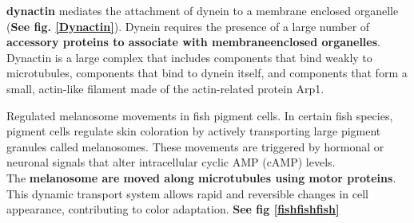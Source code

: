 \documentclass[../main.tex]{subfiles}
\begin{document}
\textbf{\gls{dynactin}} mediates the attachment of dynein to a membrane
enclosed organelle (\textbf{See fig. \ref{Dynactin}}). Dynein requires the presence of a large number of \textbf{accessory proteins to associate with membraneenclosed organelles}. Dynactin is a large complex that includes components that bind weakly to microtubules, components that bind to dynein itself, and components that form a small, actin-like filament made of the actin-related protein Arp1.

\begin{RemarkWithTitel}{Regulated melanosome movements in fish pigment cells.}
	In certain fish species, pigment cells regulate skin coloration by actively transporting large pigment granules called melanosomes. These movements are triggered by hormonal or neuronal signals that alter intracellular cyclic AMP (cAMP) levels.\\
	\indent The \textbf{melanosome are moved along microtubules using motor proteins}. This dynamic transport system allows rapid and reversible changes in cell appearance, contributing to color adaptation. \textbf{See fig \ref{fishfishfish}}
\end{RemarkWithTitel}

\begin{figure}[H]
	\centering
	\caption{}
\end{figure}
\end{document}
